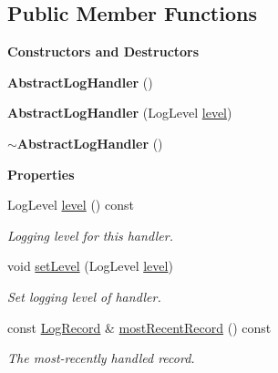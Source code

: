 \subsection*{Public Member Functions}
\begin{Indent}\textbf{ Constructors and Destructors}\par
\begin{DoxyCompactItemize}
\item 
\mbox{\label{classrev_1_1_abstract_log_handler_a7f95ac9a29ac1ebc3788de928e3b8aaa}} 
{\bfseries Abstract\+Log\+Handler} ()
\item 
\mbox{\label{classrev_1_1_abstract_log_handler_a15d5ad0c7da1750b026c6ad21c19f0a1}} 
{\bfseries Abstract\+Log\+Handler} (Log\+Level \mbox{\hyperlink{classrev_1_1_abstract_log_handler_ab27fb35504e3aaa820c4e57f406893ea}{level}})
\item 
\mbox{\label{classrev_1_1_abstract_log_handler_a94d0836f7d113e733e21b3878d5360e1}} 
{\bfseries $\sim$\+Abstract\+Log\+Handler} ()
\end{DoxyCompactItemize}
\end{Indent}
\begin{Indent}\textbf{ Properties}\par
\begin{DoxyCompactItemize}
\item 
\mbox{\label{classrev_1_1_abstract_log_handler_ab27fb35504e3aaa820c4e57f406893ea}} 
Log\+Level \mbox{\hyperlink{classrev_1_1_abstract_log_handler_ab27fb35504e3aaa820c4e57f406893ea}{level}} () const
\begin{DoxyCompactList}\small\item\em Logging level for this handler. \end{DoxyCompactList}\item 
void \mbox{\hyperlink{classrev_1_1_abstract_log_handler_ac5451e353683fa94643feb28f73a106d}{set\+Level}} (Log\+Level \mbox{\hyperlink{classrev_1_1_abstract_log_handler_ab27fb35504e3aaa820c4e57f406893ea}{level}})
\begin{DoxyCompactList}\small\item\em Set logging level of handler. \end{DoxyCompactList}\item 
\mbox{\label{classrev_1_1_abstract_log_handler_ab44f172990e72bc34d2f91101c0449db}} 
const \mbox{\hyperlink{classrev_1_1_log_record}{Log\+Record}} \& \mbox{\hyperlink{classrev_1_1_abstract_log_handler_ab44f172990e72bc34d2f91101c0449db}{most\+Recent\+Record}} () const
\begin{DoxyCompactList}\small\item\em The most-\/recently handled record. \end{DoxyCompactList}\end{DoxyCompactItemize}
\end{Indent}
